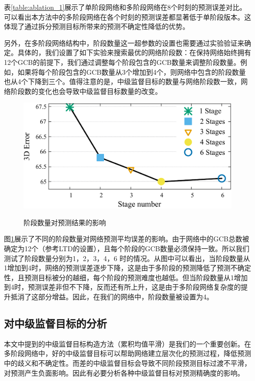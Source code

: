 表\ref{table:ablation_1}展示了单阶段网络和多阶段网络在8个时刻的预测误差对比。可以看出本方法中的多阶段网络在各个时刻的预测误差都显著低于单阶段版本。这体现了通过拆分预测目标所带来的预测不确定性降低的优势。

另外，在多阶段网络结构中，阶段数量这一超参数的设置也需要通过实验验证来确定。具体的，我们设置了如下实验来搜索最优的网络阶段数：在保持网络始终拥有12个GCB的前提下，我们通过调整每个阶段包含的GCB数量来调整阶段数量。例如，如果将每个阶段包含的GCB数量从3个增加到4个，则网络中包含的阶段数量也从4个下降到三个。值得注意的是，中级监督目标的数量与网络阶段数一致，网络阶段数的变化也会导致中级监督目标数量的改变。
\begin{figure}[ht]
    \centering
    \includegraphics[width=0.6\columnwidth]{FigMa/smooth_stage.pdf} \\
    \caption{阶段数量对预测结果的影响}
    \label{fig:ablation-stage-number}
\end{figure}

图\ref{fig:ablation-stage-number}展示了不同的阶段数量对网络预测平均误差的影响。由于网络中的GCB总数被确定为12个（参考LTD的设置），且每个阶段的GCB数量必须保持一致。所以我们测试了阶段数量分别为1，2，3，4，6 时的情况。从图中可以看出，当阶段数量从1增加到4时，网络的预测误差逐步下降，这是由于多阶段的预测降低了预测不确定性，且预测目标被分的越细，每个阶段的预测难度也越低。但当阶段数量从1增加到4时，预测误差非但不下降，反而还有所上升，这是由于多阶段网络复杂度的提升抵消了这部分增益。因此，在我们的网络中，阶段数量被设置为4。

\subsection{对中级监督目标的分析}
本文中提到的中级监督目标构造方法（累积均值平滑）是我们的一个重要创新。在多阶段网络中，好的中级监督目标可以帮助网络建立层次化的预测过程，降低预测中的歧义和不确定性。而差的中级监督目标会导致不同阶段预测目标过渡不平滑，对预测产生负面影响。因此有必要分析各种中级监督目标对预测精确度的影响。

